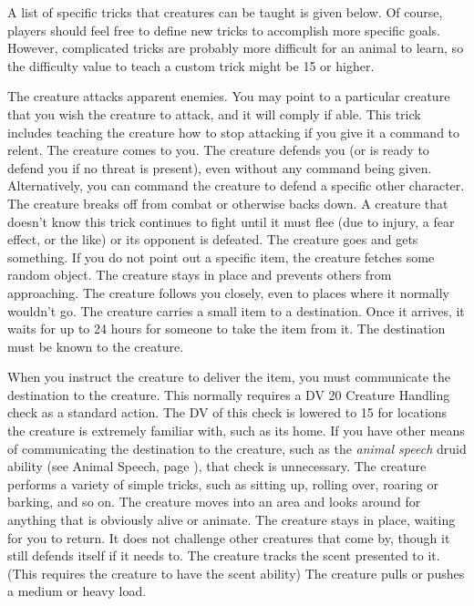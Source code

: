         A list of specific tricks that creatures can be taught is given below.
        Of course, players should feel free to define new tricks to accomplish more specific goals.
        However, complicated tricks are probably more difficult for an animal to learn, so the difficulty value to teach a custom trick might be 15 or higher.

         The creature attacks apparent enemies. You may point to a particular creature that you wish the creature to attack, and it will comply if able. This trick includes teaching the creature how to stop attacking if you give it a command to relent.
         The creature comes to you.
         The creature defends you (or is ready to defend you if no threat is present), even without any command being given. Alternatively, you can command the creature to defend a specific other character.
         The creature breaks off from combat or otherwise backs down. A creature that doesn't know this trick continues to fight until it must flee (due to injury, a fear effect, or the like) or its opponent is defeated.
         The creature goes and gets something. If you do not point out a specific item, the creature fetches some random object.
         The creature stays in place and prevents others from approaching.
         The creature follows you closely, even to places where it normally wouldn't go.
         The creature carries a small item to a destination.
        Once it arrives, it waits for up to 24 hours for someone to take the item from it.
        The destination must be known to the creature.
        \par When you instruct the creature to deliver the item, you must communicate the destination to the creature.
        This normally requires a DV 20 Creature Handling check as a standard action.
        The DV of this check is lowered to 15 for locations the creature is extremely familiar with, such as its home.
        If you have other means of communicating the destination to the creature, such as the \textit{animal speech} druid ability (see Animal Speech, page ), that check is unnecessary.
         The creature performs a variety of simple tricks, such as sitting up, rolling over, roaring or barking, and so on.
         The creature moves into an area and looks around for anything that is obviously alive or animate.
         The creature stays in place, waiting for you to return. It does not challenge other creatures that come by, though it still defends itself if it needs to.
         The creature tracks the scent presented to it. (This requires the creature to have the scent ability)
         The creature pulls or pushes a medium or heavy load.

